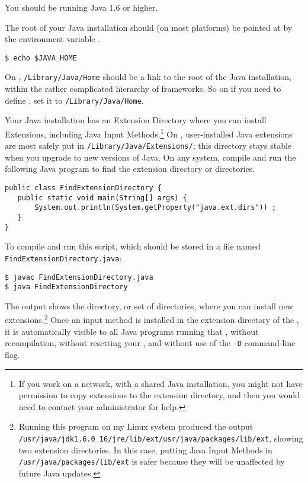 \noindent
You should be running Java 1.6 or higher.

The root of your Java installation should (on most platforms) be pointed
at by the environment variable .  

\begin{Verbatim}
$ echo $JAVA_HOME
\end{Verbatim}

\noindent
On , \texttt{/Library/Java/Home} should be a link to the root
of the Java installation, within the rather complicated hierarchy of
 frameworks.  So on  if you need to define
, set it to \texttt{/Library/Java/Home}.

Your Java installation has an Extension Directory where you can install
Extensions, including Java Input Methods.\footnote{If you work on a
network, with a shared Java installation, you might not have permission
to copy extensions to the extension directory, and then you would need to
contact your administrator for help.}  On , user-installed
Java extensions are most safely put in
\texttt{/Library/Java/Extensions/}; this directory stays stable when you
upgrade to new versions of Java.  On any system, compile and run the
following Java program to find the extension directory or
directories.

\begin{Verbatim}
public class FindExtensionDirectory {
   public static void main(String[] args) {
       System.out.println(System.getProperty("java.ext.dirs")) ;
   }
}
\end{Verbatim}
 
\noindent
To compile and run this script, which should be stored in a file
named \texttt{FindExtensionDirectory.java}:

\begin{Verbatim}
$ javac FindExtensionDirectory.java
$ java FindExtensionDirectory
\end{Verbatim}

\noindent
The output shows the directory, or set of directories, where you can
install new extensions.\footnote{Running this program on my Linux system
produced the output 
\texttt{/usr/java/jdk1.6.0\_16/jre/lib/ext/usr/java/packages/lib/ext}, 
showing two extension directories.  In this
case, putting Java Input Methods in \texttt{/usr/java/packages/lib/ext}
is safer because they will be unaffected by future Java updates.} Once an
input method is installed in the extension directory of the ,
it is automatically visible to all Java programs running that ,
without recompilation, without resetting your , and
without use of the \verb!-D! command-line flag.  

